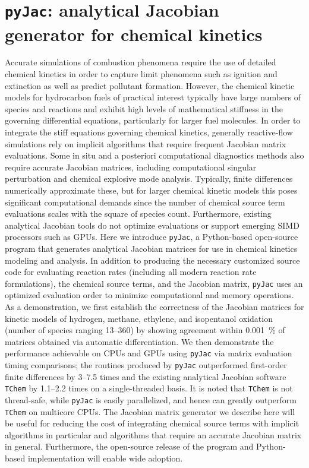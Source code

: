 \documentclass[a4paper,10pt]{article}
\begin{document}
\renewcommand*{\thesection}{\appendixname~\Alph{section}}

\section{\texttt{pyJac}: analytical Jacobian generator for chemical kinetics}
Accurate simulations of combustion phenomena require the use of detailed chemical kinetics in order to capture limit phenomena such as ignition and extinction as well as predict pollutant formation.
However, the chemical kinetic models for hydrocarbon fuels of practical interest typically have large numbers of species and reactions and exhibit high levels of mathematical stiffness in the governing differential equations, particularly for larger fuel molecules.
In order to integrate the stiff equations governing chemical kinetics, generally reactive-flow simulations rely on implicit algorithms that require frequent Jacobian matrix evaluations.
Some in situ and a posteriori computational diagnostics methods also require accurate Jacobian matrices, including computational singular perturbation and chemical explosive mode analysis.
Typically, finite differences numerically approximate these, but for larger chemical kinetic models this poses significant computational demands since the number of chemical source term evaluations scales with the square of species count.
Furthermore, existing analytical Jacobian tools do not optimize evaluations or support emerging SIMD processors such as GPUs.
Here we introduce \texttt{pyJac}, a Python-based open-source program that generates analytical Jacobian matrices for use in chemical kinetics modeling and analysis.
In addition to producing the necessary customized source code for evaluating reaction rates (including all modern reaction rate formulations), the chemical source terms, and the Jacobian matrix, \texttt{pyJac} uses an optimized evaluation order to minimize computational and memory operations.
As a demonstration, we first establish the correctness of the Jacobian matrices for kinetic models of hydrogen, methane, ethylene, and isopentanol oxidation (number of species ranging \numrange{13}{360}) by showing agreement within \SI{0.001}{\percent} of matrices obtained via automatic differentiation.
We then demonstrate the performance achievable on CPUs and GPUs using \texttt{pyJac} via matrix evaluation timing comparisons; the routines produced by \texttt{pyJac} outperformed first-order finite differences by \numrange{3}{7.5} times and the existing analytical Jacobian software \texttt{TChem} by \numrange{1.1}{2.2} times on a single-threaded basis.
It is noted that \texttt{TChem} is not thread-safe, while \texttt{pyJac} is easily parallelized, and hence can greatly outperform \texttt{TChem} on multicore CPUs.
The Jacobian matrix generator we describe here will be useful for reducing the cost of integrating chemical source terms with implicit algorithms in particular and algorithms that require an accurate Jacobian matrix in general.
Furthermore, the open-source release of the program and Python-based implementation will enable wide adoption.





\end{document}
